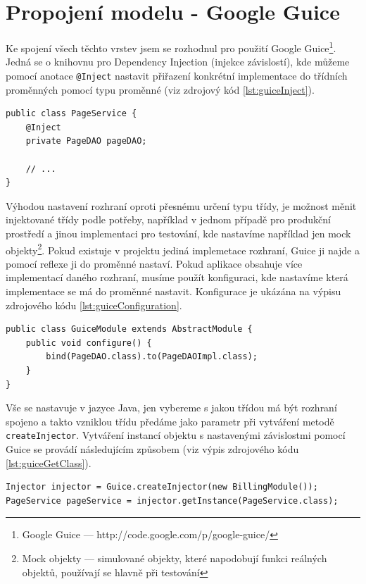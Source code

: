 \section{Propojení modelu - Google Guice}
Ke spojení všech těchto vrstev jsem se rozhodnul pro použití Google Guice\footnote{Google Guice --- http://code.google.com/p/google-guice/}. Jedná se o knihovnu pro Dependency Injection (injekce závislostí), kde můžeme pomocí anotace \verb|@Inject| nastavit přiřazení konkrétní implementace do třídních proměnných pomocí typu proměnné (viz zdrojový kód \ref{lst:guiceInject}).

\begin{lstlisting}[caption={Ukázka použití Google Guice za pomocí anotace @Inject},label=lst:guiceInject,belowcaptionskip=0.4cm]
public class PageService {
	@Inject
	private PageDAO pageDAO;

	// ...
}
\end{lstlisting}

Výhodou nastavení rozhraní oproti přesnému určení typu třídy, je možnost měnit injektované třídy podle potřeby, například v jednom případě pro produkční prostředí a jinou implementaci pro testování, kde nastavíme například jen mock objekty\footnote{Mock objekty --- simulované objekty, které napodobují funkci reálných objektů, používají se hlavně při testování}. Pokud existuje v projektu jediná implemetace rozhraní, Guice ji najde a pomocí reflexe ji do proměnné nastaví. Pokud aplikace obsahuje více implementací daného rozhraní, musíme použít konfiguraci, kde nastavíme která implementace se má do proměnné nastavit. Konfigurace je ukázána na výpisu zdrojového kódu \ref{lst:guiceConfiguration}.

\begin{lstlisting}[caption={Příklad konfigurace Google Guice},label=lst:guiceConfiguration,belowcaptionskip=0.4cm]
public class GuiceModule extends AbstractModule {
	public void configure() {
		bind(PageDAO.class).to(PageDAOImpl.class);
	}
}
\end{lstlisting}

Vše se nastavuje v jazyce Java, jen vybereme s jakou třídou má být rozhraní spojeno a takto vzniklou třídu předáme jako parametr při vytváření metodě \verb|createInjector|. Vytváření instancí objektu s nastavenými závislostmi pomocí Guice se provádí následujícím způsobem (viz výpis zdrojového kódu \ref{lst:guiceGetClass}).

\begin{lstlisting}[caption={Získávání sestavených tříd pomocí Google Guice},label=lst:guiceGetClass,belowcaptionskip=0.4cm]
Injector injector = Guice.createInjector(new BillingModule());
PageService pageService = injector.getInstance(PageService.class);
\end{lstlisting}

